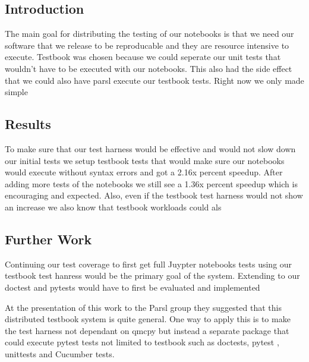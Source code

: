 \begin{comment}
\title{parslTestbookQMCblog}
\author{Dr. Sou-Cheng Choi, Illinois Tech and  SouLab, Joshua Jay Herman (QMC Development Team)}
\date{September 2025}

\maketitle
Accelerating QMCpy Notebook Tests with Parsl
\end{comment}

\subsection{Introduction}

The main goal for distributing the testing of our notebooks is that we need our software that we release to be reproducable and they are resource intensive to execute. Testbook was chosen because we could seperate our unit tests that wouldn't have to be executed with our notebooks. This also had the side effect that we could also have parsl execute our testbook tests. Right now we only made simple 

\subsection{Results}
To make sure that our test harness would be effective and would not slow down our initial tests we setup testbook tests that would make sure our notebooks would execute without syntax errors and got a 2.16x percent speedup. After adding more tests of the notebooks we still see a 1.36x percent speedup which is encouraging and expected. Also, even if the testbook test harness would not show an increase we also know that testbook workloads could als 

\subsection{Further Work}

Continuing our test coverage to first get full Juypter notebooks tests using our testbook test hanress would be the primary goal of the system. Extending to our doctest and pytests would have to first be evaluated and implemented 

At the presentation of this work to the Parsl group they suggested that this distributed testbook system is quite general. One way to apply this is to make the test harness not dependant on qmcpy but instead a separate package that could execute pytest tests not limited to testbook such as doctests, pytest , unittests and Cucumber tests.